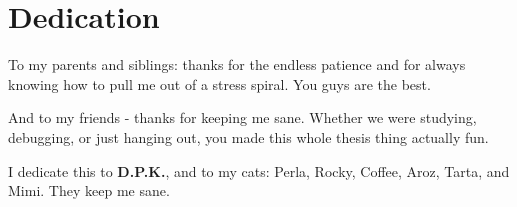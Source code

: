 \chapter*{Dedication}

To my parents and siblings: thanks for the endless patience and for always knowing how to pull me out of a stress spiral. You guys are the best.

And to my friends - thanks for keeping me sane. Whether we were studying, debugging, or just hanging out, you made this whole thesis thing actually fun.

\begin{flushright}
\textbf{\studentFullnameB}
\end{flushright}

\bigskip

I dedicate this to \textbf{D.P.K.}, and to my cats: Perla, Rocky, Coffee, Aroz, Tarta, and Mimi. They keep me sane.

\begin{flushright}
\textbf{\studentFullnameA}
\end{flushright}

